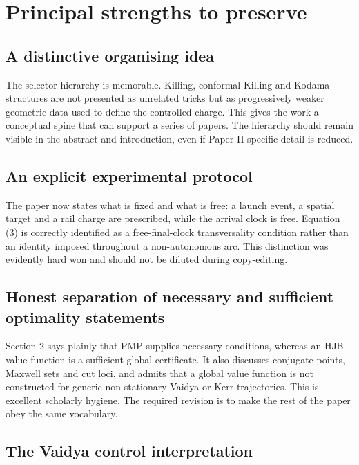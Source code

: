 \documentclass[11pt,a4paper]{article}
\begin{document}
\section{Principal strengths to preserve}

\subsection{A distinctive organising idea}

The selector hierarchy is memorable.  Killing, conformal Killing and Kodama structures are not
presented as unrelated tricks but as progressively weaker geometric data used to define the
controlled charge.  This gives the work a conceptual spine that can support a series of papers.
The hierarchy should remain visible in the abstract and introduction, even if Paper-II-specific
detail is reduced.

\subsection{An explicit experimental protocol}

The paper now states what is fixed and what is free: a launch event, a spatial target and a rail
charge are prescribed, while the arrival clock is free.  Equation (3) is correctly identified as
a free-final-clock transversality condition rather than an identity imposed throughout a
non-autonomous arc.  This distinction was evidently hard won and should not be diluted during
copy-editing.

\subsection{Honest separation of necessary and sufficient optimality statements}

Section 2 says plainly that PMP supplies necessary conditions, whereas an HJB value function is a
sufficient global certificate.  It also discusses conjugate points, Maxwell sets and cut loci,
and admits that a global value function is not constructed for generic non-stationary Vaidya or
Kerr trajectories.  This is excellent scholarly hygiene.  The required revision is to make the
rest of the paper obey the same vocabulary.

\subsection{The Vaidya control interpretation}
\end{document}
